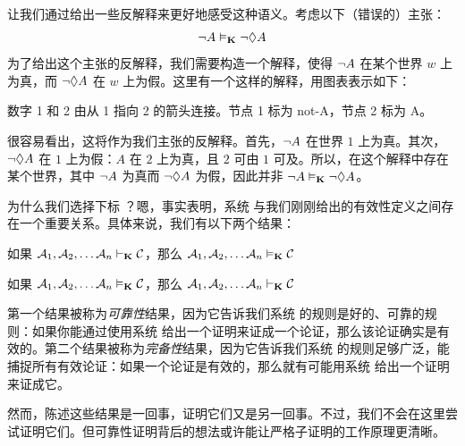 让我们通过给出一些反解释来更好地感受这种语义。考虑以下（错误的）主张：
\[\neg A\vDash_{\mathbf{K}} \neg \Diamond A\]
为了给出这个主张的反解释，我们需要构造一个解释，使得 $\neg A$ 在某个世界 $w$ 上为真，而 $\neg\Diamond A$ 在 $w$ 上为假。这里有一个这样的解释，用图表表示如下：


\begin{center}
\begin{arialabel}{数字 1 和 2 由从 1 指向 2 的箭头连接。节点 1 标为 not-A，节点 2 标为 A。}
\end{arialabel}
\end{center}


很容易看出，这将作为我们主张的反解释。首先，$\neg A$ 在世界 $1$ 上为真。其次，$\neg\Diamond A$ 在 $1$ 上为假：$A$ 在 $2$ 上为真，且 $2$ 可由 $1$ 可及。所以，在这个解释中存在某个世界，其中 $\neg A$ 为真而 $\neg\Diamond A$ 为假，因此并非 $\neg A\vDash_{\mathbf{K}}\neg\Diamond A$。

为什么我们选择下标 \mlK？嗯，事实表明，系统 \mlK 与我们刚刚给出的有效性定义之间存在一个重要关系。具体来说，我们有以下两个结果：


\begin{compactlist}
	\item 如果 $\mathcal{A}_1,\mathcal{A}_2, \dots \mathcal{A}_n\vdash_{\mathbf{K}}\mathcal{C}$，那么 $\mathcal{A}_1,\mathcal{A}_2, \dots \mathcal{A}_n\vDash_{\mathbf{K}}\mathcal{C}$
	\item 如果 $\mathcal{A}_1,\mathcal{A}_2, \dots \mathcal{A}_n\vDash_{\mathbf{K}}\mathcal{C}$，那么 $\mathcal{A}_1,\mathcal{A}_2, \dots \mathcal{A}_n\vdash_{\mathbf{K}}\mathcal{C}$
\end{compactlist}


第一个结果被称为\emph{可靠性}结果，因为它告诉我们系统 \mlK 的规则是好的、可靠的规则：如果你能通过使用系统 \mlK 给出一个证明来证成一个论证，那么该论证确实是有效的。第二个结果被称为\emph{完备性}结果，因为它告诉我们系统 \mlK 的规则足够广泛，能捕捉所有有效论证：如果一个论证是有效的，那么就有可能用系统 \mlK 给出一个证明来证成它。

然而，陈述这些结果是一回事，证明它们又是另一回事。不过，我们不会在这里尝试证明它们。但可靠性证明背后的想法或许能让严格子证明的工作原理更清晰。

